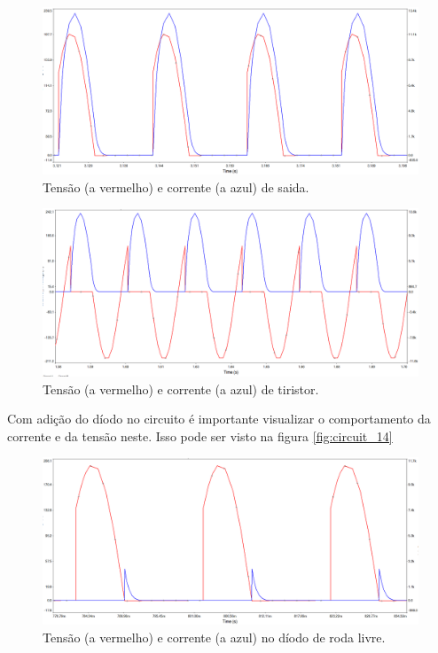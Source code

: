 \documentclass[a4paper,11pt]{article}
\numberwithin{equation}{section}
\begin{document}
\begin{figure}[h]
	\centering
	\includegraphics[keepaspectratio=true, scale=0.3]{img/circuito10}
	\caption{Tensão (a vermelho) e corrente (a azul) de saida.}
	\label{fig:circuit_12}
	\vspace{-0.8em}
\end{figure}
\begin{figure}[h]
	\centering
	\includegraphics[keepaspectratio=true, scale=0.3]{img/circuito11}
	\caption{Tensão (a vermelho) e corrente (a azul) de tiristor.}
	\label{fig:circuit_13}
	\vspace{-0.8em}
\end{figure}
\pagebreak

Com adição do díodo no circuito é importante visualizar o comportamento da corrente e da tensão neste. Isso pode ser visto na figura \autoref{fig:circuit_14}

\begin{figure}[h]
	\centering
	\includegraphics[keepaspectratio=true, scale=0.3]{img/circuito12}
	\caption{Tensão (a vermelho) e corrente (a azul) no díodo de roda livre.}
	\label{fig:circuit_14}
	\vspace{-0.8em}
\end{figure}
\end{document}

